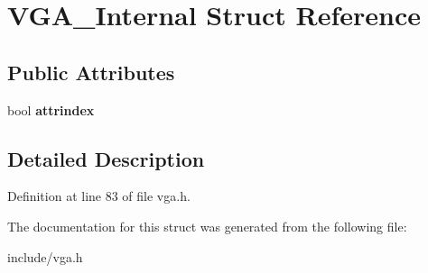 \hypertarget{structVGA__Internal}{\section{V\-G\-A\-\_\-\-Internal Struct Reference}
\label{structVGA__Internal}
}
\subsection*{Public Attributes}
\begin{DoxyCompactItemize}
\item 
\hypertarget{structVGA__Internal_a36feb3e3abbf2c0f50f3fbe45ad763aa}{bool {\bfseries attrindex}}\label{structVGA__Internal_a36feb3e3abbf2c0f50f3fbe45ad763aa}

\end{DoxyCompactItemize}


\subsection{Detailed Description}


Definition at line 83 of file vga.\-h.



The documentation for this struct was generated from the following file\-:\begin{DoxyCompactItemize}
\item 
include/vga.\-h\end{DoxyCompactItemize}
